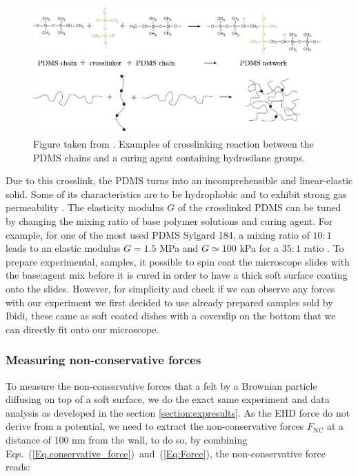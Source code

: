 \begin{figure}[H]
	\centering
	\includegraphics[scale = 0.8]{02_body/chapter4/images/EHD_forces/figure_cross.png}
	\caption{Figure taken from \cite{tucher_analysis_2016}. Examples of crosslinking reaction between the \gls{PDMS} chains and a curing agent containing hydrosilane groups.}
	\label{fig.crosslink}
\end{figure}


Due to this crosslink, the \gls{PDMS} turns into an incomprehensible and linear-elastic solid. Some of its characteristics are to be hydrophobic and to exhibit strong gas permeability \cite{xia_soft_1998}. The elasticity modulus $G$ of the crosslinked \gls{PDMS} can be tuned by changing the mixing ratio of base polymer solutions and curing agent. For example, for one of the most used \gls{PDMS} Sylgard 184, a mixing ratio of $10:1$ leads to an elastic modulus $G=1.5$ MPa and $G\simeq 100$ kPa for a $35:1$ ratio \cite{wang_crosslinking_2014}. To prepare experimental, samples, it possible to spin coat the microscope slides with the base:agent mix before it is cured in order to have a thick soft surface coating onto the slides. However, for simplicity and check if we can observe any forces with our experiment we first decided to use already prepared samples sold by Ibidi, these came as soft coated dishes with a coverslip on the bottom that we can directly fit onto our microscope.


\subsubsection{Measuring non-conservative forces}

To measure the non-conservative forces that a felt by a Brownian particle diffusing on top of a soft surface, we do the exact same experiment and data analysis as developed in the section \ref{section:expresults}. As the \gls{EHD} force do not derive from a potential, we need to extract the non-conservative forces $F_\mathrm{NC}$ at a distance of 100 nm from the wall, to do so, by combining Eqs.~(\ref{Eq.conservative_force})~and~(\ref{Eq:Force}), the non-conservative force reads:

